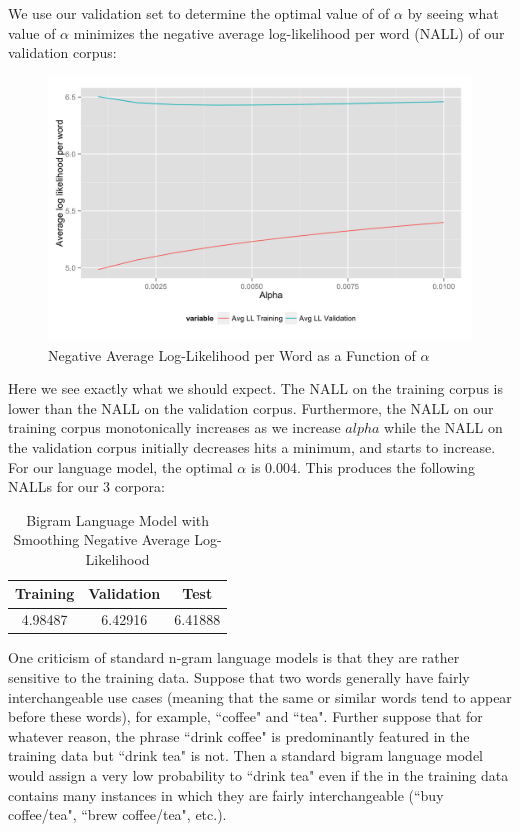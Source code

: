 \documentclass[fleqn,12pt]{SelfArx} %
\begin{document}
We use our validation set to determine the optimal value of of $\alpha$ by seeing what value of $\alpha$ minimizes the negative average log-likelihood per word (NALL) of our validation corpus:
\begin{figure}[ht]\centering
\includegraphics[width=\linewidth]{bigram_add_a.png}
\caption{Negative Average Log-Likelihood per Word as a Function of $\alpha$}
\label{fig:fre_hist}
\end{figure}
Here we see exactly what we should expect. The NALL on the training corpus is lower than the NALL on the validation corpus. Furthermore, the NALL on our training corpus monotonically increases as we increase $alpha$ while the NALL on the validation corpus initially decreases hits a minimum, and starts to increase. For our language model, the optimal $\alpha$ is 0.004. This produces the following NALLs for our 3 corpora:

\begin{table}[hbt]
\caption{Bigram Language Model with Smoothing Negative Average Log-Likelihood}
\centering
\begin{tabular}{ccc}
\toprule
Training &  Validation & Test\\
\midrule
4.98487 & 6.42916 &  6.41888\\
\bottomrule
\end{tabular}
\end{table}

One criticism of standard n-gram language models is that they are rather sensitive to the training data. Suppose that two words generally have fairly interchangeable use cases (meaning that the same or similar words tend to appear before these words), for example, ``coffee" and ``tea". Further suppose that for whatever reason, the phrase ``drink coffee" is predominantly featured in the training data but ``drink tea" is not. Then a standard bigram language model would assign a very low probability to ``drink tea" even if the in the training data contains many instances in which they are fairly interchangeable (``buy coffee/tea", ``brew coffee/tea", etc.).
\end{document}
